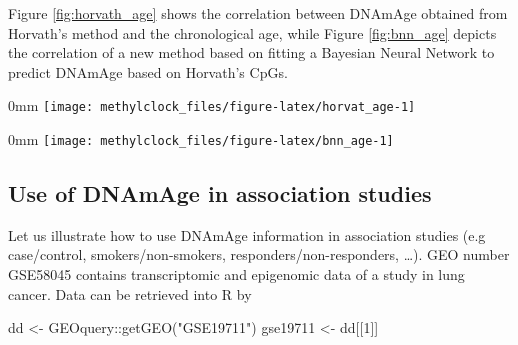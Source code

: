 \documentclass[]{article}
\newcommand{\hlnum}[1]{\textcolor[rgb]{0.816,0.125,0.439}{#1}}%
\newcommand{\hlstr}[1]{\textcolor[rgb]{0.251,0.627,0.251}{#1}}%
\newcommand{\hlopt}[1]{\textcolor[rgb]{0,0,0}{#1}}%
\newcommand{\hlstd}[1]{\textcolor[rgb]{0.251,0.251,0.251}{#1}}%
\newcommand{\hlkwc}[1]{\textcolor[rgb]{0.251,0.251,0.251}{#1}}%
\newcommand{\hlkwd}[1]{\textcolor[rgb]{0.878,0.439,0.125}{#1}}%
\newenvironment{Shaded}{\begin{myshaded}}{\end{myshaded}}
\newcommand{\KeywordTok}[1]{\hlkwd{#1}}
\newcommand{\DataTypeTok}[1]{\hlkwc{#1}}
\newcommand{\DecValTok}[1]{\hlnum{#1}}
\newcommand{\StringTok}[1]{\hlstr{#1}}
\newcommand{\OperatorTok}[1]{\hlopt{#1}}
\newcommand{\NormalTok}[1]{\hlstd{#1}}
\begin{document}
Figure \ref{fig:horvath_age} shows the correlation between DNAmAge obtained from Horvath's method and the chronological age, while Figure \ref{fig:bnn_age} depicts the correlation of a new method based on fitting a Bayesian Neural Network to predict DNAmAge based on Horvath's CpGs.

\begin{Shaded}
\end{Shaded}

\begin{adjustwidth}{\fltoffset}{0mm}
\texttt{[image: methylclock\_files/figure-latex/horvat\_age-1]} \end{adjustwidth}

\begin{Shaded}
\end{Shaded}

\begin{adjustwidth}{\fltoffset}{0mm}
\texttt{[image: methylclock\_files/figure-latex/bnn\_age-1]} \end{adjustwidth}

\hypertarget{use-of-dnamage-in-association-studies}{%
\subsection{Use of DNAmAge in association studies}\label{use-of-dnamage-in-association-studies}}

Let us illustrate how to use DNAmAge information in association studies (e.g case/control, smokers/non-smokers, responders/non-responders, \ldots{}). GEO number GSE58045 contains transcriptomic and epigenomic data of a study in lung cancer. Data can be retrieved into R by

\begin{Shaded}
\begin{Highlighting}[]
\NormalTok{dd <-}\StringTok{ }\NormalTok{GEOquery}\OperatorTok{::}\KeywordTok{getGEO}\NormalTok{(}\StringTok{"GSE19711"}\NormalTok{)}
\NormalTok{gse19711 <-}\StringTok{ }\NormalTok{dd[[}\DecValTok{1}\NormalTok{]]}
\end{Highlighting}
\end{Shaded}
\end{document}
